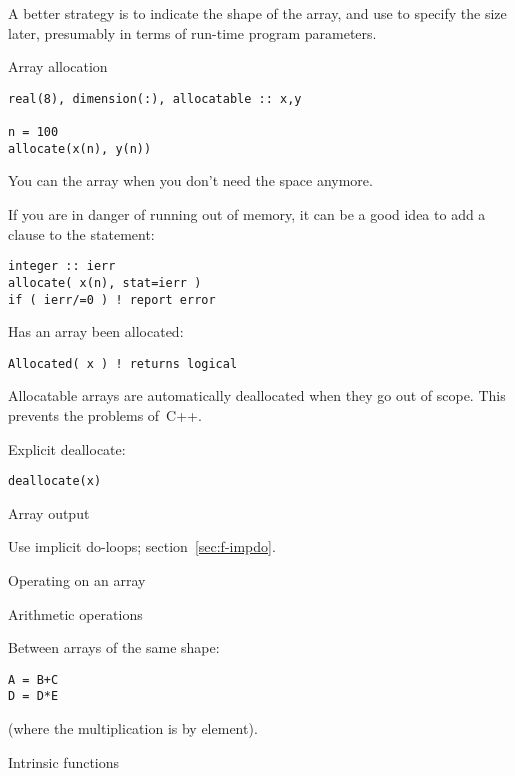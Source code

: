 A better strategy is to indicate the shape of the array, and use
 to specify
the size later, presumably in terms of run-time program parameters.

\begin{block}{Array allocation}
  \label{sl:farray-alloc}
\begin{lstlisting}
real(8), dimension(:), allocatable :: x,y

n = 100
allocate(x(n), y(n))
\end{lstlisting}
You can  the array when you don't need the
space anymore.
\end{block}

If you are in danger of running out of memory, it can be a good idea
to add a  clause to the  statement:
\begin{lstlisting}
integer :: ierr
allocate( x(n), stat=ierr )
if ( ierr/=0 ) ! report error
\end{lstlisting}

Has an array been allocated:
\begin{lstlisting}
Allocated( x ) ! returns logical
\end{lstlisting}

Allocatable arrays are automatically deallocated when they go out of
scope. This prevents the  problems of~C++.

Explicit deallocate:
\begin{lstlisting}
deallocate(x)
\end{lstlisting}

 {Array output}

Use implicit do-loops; section~\ref{sec:f-impdo}.

 {Operating on an array}

 {Arithmetic operations}

Between arrays of the same shape:
\begin{lstlisting}
A = B+C
D = D*E
\end{lstlisting}
(where the multiplication is by element).

 {Intrinsic functions}

